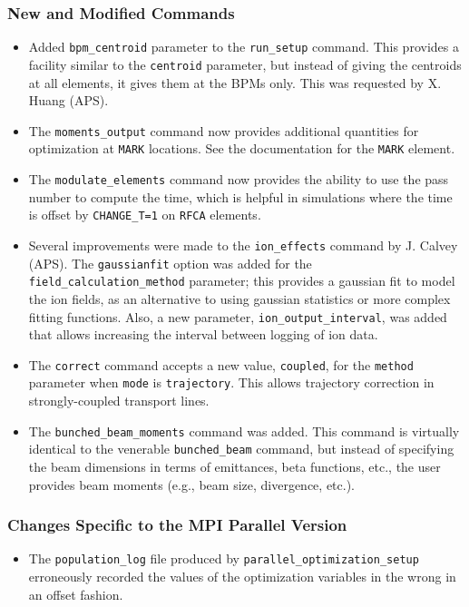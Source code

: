\documentclass[11pt]{article}
\begin{document}
\subsubsection{New and Modified Commands}
\begin{itemize}
\item Added \verb|bpm_centroid| parameter to the \verb|run_setup| command. This provides a facility similar to the 
  \verb|centroid| parameter, but instead of giving the centroids at all elements, it gives them at the BPMs only.
  This was requested by X. Huang (APS).
\item The \verb|moments_output| command now provides additional quantities for optimization at \verb|MARK| locations.
  See the documentation for the \verb|MARK| element.
\item The \verb|modulate_elements| command now provides the ability to use the pass number to compute the time,
  which is helpful in simulations where the time is offset by \verb|CHANGE_T=1| on \verb|RFCA| elements.
\item Several improvements were made to the \verb|ion_effects| command by J. Calvey (APS).  The \verb|gaussianfit| option was added
  for the \verb|field_calculation_method| parameter; this provides a gaussian fit to model the ion fields, as an
  alternative to using gaussian statistics or more complex fitting functions. Also, a new parameter, \verb|ion_output_interval|,
  was added that allows increasing the interval between logging of ion data.
\item The \verb|correct| command accepts a new value, \verb|coupled|, for the \verb|method| parameter when 
  \verb|mode| is \verb|trajectory|. This allows trajectory correction in strongly-coupled transport lines.
\item The \verb|bunched_beam_moments| command was added. This command is virtually identical to the venerable
  \verb|bunched_beam| command, but instead of specifying the beam dimensions in terms of emittances, beta functions, etc.,
  the user provides beam moments (e.g., beam size, divergence, etc.).
\end{itemize}

\subsubsection{Changes Specific to the MPI Parallel Version}

\begin{itemize}
\item The \verb|population_log| file produced by \verb|parallel_optimization_setup| erroneously recorded the
  values of the optimization variables in the wrong in an offset fashion. 
\end{itemize}
\end{document}
